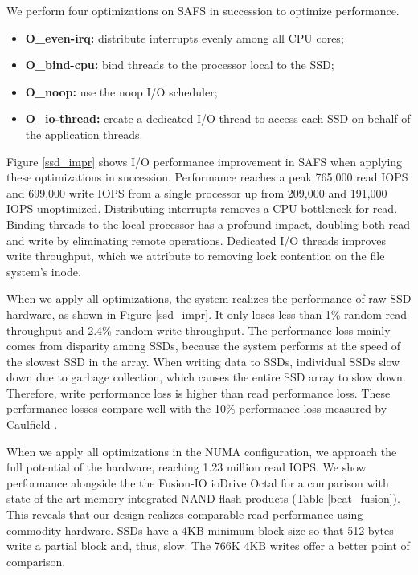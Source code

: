 We perform four optimizations on SAFS in succession to optimize performance.
\vspace{-10pt}
\begin{itemize}
\addtolength{\itemsep}{-5pt}
\item {\bf O\_even-irq:} distribute interrupts evenly among all CPU cores;
\item {\bf O\_bind-cpu:} bind threads to the processor local to the SSD;
\item {\bf O\_noop:} use the noop I/O scheduler;
\item {\bf O\_io-thread:} create a dedicated I/O thread to access each SSD on behalf of
the application threads.
\end{itemize}
\vspace{-10pt}
Figure \ref{ssd_impr} shows I/O performance improvement in SAFS when applying
these optimizations in succession.
Performance reaches a peak 765,000 read IOPS and 699,000 write IOPS from 
a single processor up from 209,000 and 191,000 IOPS unoptimized.
Distributing interrupts removes a CPU bottleneck for read.  Binding threads 
to the local processor has a profound impact, doubling both read and write by
eliminating remote operations.
Dedicated I/O threads improves write throughput, which we attribute to 
removing lock contention on the file system's inode.

When we apply all optimizations, the system realizes
the performance of raw SSD hardware, as shown in Figure \ref{ssd_impr}.
It only loses less than 1\% random read throughput
and 2.4\% random write throughput. The performance loss mainly comes from
disparity among SSDs, because the system performs at the speed
of the slowest SSD in the array.
When writing data to SSDs, individual SSDs slow down due to garbage
collection, which causes the entire SSD array to slow down. Therefore, write
performance loss is higher than read performance loss. 
These performance losses compare well with the 
10\% performance loss measured by Caulfield \cite{Caulfield10}.

When we apply all optimizations in the NUMA configuration, we approach the 
full potential of the hardware, reaching 1.23 million read IOPS.
We show performance alongside the
the Fusion-IO ioDrive Octal \cite{fusion} for a comparison with state of the 
art memory-integrated NAND flash products (Table \ref{beat_fusion}). 
This reveals that our design realizes comparable
read performance using commodity hardware.
SSDs have a 4KB minimum block size so that 512 bytes write a partial block 
and, thus, slow.  The 766K 4KB writes offer a better point of comparison.

